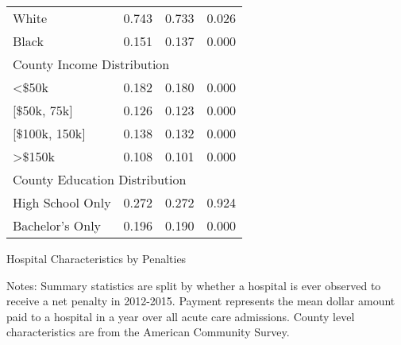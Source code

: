 \documentclass[12pt]{article}
\begin{document}
{\begin{tabular}{lccc}
\hspace{0.05in}White     &     0.743   &     0.733    &    0.026\\
\hspace{0.05in}Black    &     0.151  &      0.137   &     0.000\\
\multicolumn{4}{l}{County Income Distribution}\\
\hspace{0.05in}<$\$$50k   &    0.182   &     0.180      &  0.000\\
\hspace{0.05in}[$\$$50k, 75k]   &   0.126   &     0.123    &    0.000\\
\hspace{0.05in}[$\$$100k, 150k]       & 0.138     &   0.132  &      0.000\\
\hspace{0.05in}>$\$$150k   &    0.108    &    0.101 &       0.000\\
\multicolumn{4}{l}{County Education Distribution}\\
\hspace{0.05in}High School Only   &     0.272   &     0.272   &     0.924\\
\hspace{0.05in}Bachelor's Only      &     0.196    &    0.190   &     0.000\\
\hline
\end{tabular}
}
\setlength{\captionmargin}{.5 \textwidth} \addtolength{\captionmargin}{-.5\wd\gfxbox}
\begin{table}[!h]
\centering
\caption{Hospital Characteristics by Penalties}
\label{tab:bypenalty}
\usebox{\gfxbox}
\par
\begin{minipage}{\wd\gfxbox}
\footnotesize
Notes: Summary statistics are split by whether a hospital is ever observed to receive a net penalty in 2012-2015. Payment represents the mean dollar amount paid to a hospital in a year over all acute care admissions.   County level characteristics are from the American Community Survey.
\end{minipage}
\end{table}
\end{document}
